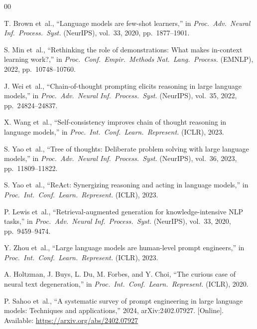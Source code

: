 \documentclass[conference]{IEEEtran}
\begin{document}
\begin{thebibliography}{00}

 T. Brown et~al., ``Language models are few-shot
learners,'' in \emph{Proc.\ Adv.\ Neural Inf.\ Process.\ Syst.}
(NeurIPS), vol.~33, 2020, pp.~1877--1901.

 S. Min et~al., ``Rethinking the role of
demonstrations: What makes in-context learning work?,'' in
\emph{Proc.\ Conf.\ Empir.\ Methods Nat.\ Lang.\ Process.}
(EMNLP), 2022, pp.~10748--10760.

 J. Wei et~al., ``Chain-of-thought
prompting elicits reasoning in large language models,'' in
\emph{Proc.\ Adv.\ Neural Inf.\ Process.\ Syst.} (NeurIPS), vol.~35,
2022, pp.~24824--24837.

 X. Wang et~al., ``Self-consistency improves
chain of thought reasoning in language models,'' in \emph{Proc.\ Int.\
Conf.\ Learn.\ Represent.} (ICLR), 2023.

 S. Yao et~al., ``Tree of thoughts: Deliberate problem
solving with large language models,'' in \emph{Proc.\ Adv.\ Neural
Inf.\ Process.\ Syst.} (NeurIPS), vol.~36, 2023,
pp.~11809--11822.

 S. Yao et~al., ``ReAct: Synergizing reasoning and acting
in language models,'' in \emph{Proc.\ Int.\ Conf.\ Learn.\
Represent.} (ICLR), 2023.

 P. Lewis et~al., ``Retrieval-augmented generation for
knowledge-intensive NLP tasks,'' in \emph{Proc.\ Adv.\ Neural Inf.\
Process.\ Syst.} (NeurIPS), vol.~33, 2020, pp.~9459--9474.

\bibitem{b17} Y. Zhou et~al., ``Large language models are human-level
prompt engineers,'' in \emph{Proc.\ Int.\ Conf.\ Learn.\ Represent.}
(ICLR), 2023.

\bibitem{b8} A. Holtzman, J. Buys, L. Du, M. Forbes, and Y. Choi,
``The curious case of neural text degeneration,'' in \emph{Proc.\
Int.\ Conf.\ Learn.\ Represent.} (ICLR), 2020.

\bibitem{b23} P. Sahoo et~al., ``A systematic survey of prompt
engineering in large language models: Techniques and applications,''
2024, arXiv:2402.07927. [Online]. Available:
\url{https://arxiv.org/abs/2402.07927}


\end{thebibliography}
\end{document}
